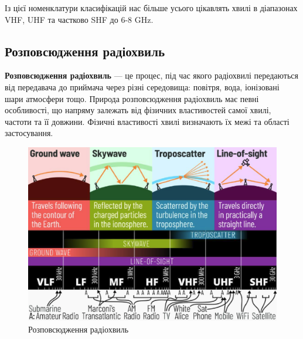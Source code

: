 \documentclass{article}
\begin{document}
Із цієї номенклатури класифікацій нас більше усього цікавлять хвилі в діапазонах VHF, UHF та частково SHF до 6-8 GHz.


\subsection{Розповсюдження радіохвиль}

\textbf{Розповсюдження радіохвиль} — це процес, під час якого радіохвилі передаються від передавача до приймача через різні середовища: повітря, вода, іонізовані шари атмосфери тощо. Природа розповсюдження радіохвиль має певні особливості, що напряму залежать від фізичних властивостей самої хвилі, частоти та її довжини. Фізичні властивості хвилі визначають їх межі та області застосування.

\begin{figure}[h!]
	\centering
	\includegraphics[width=0.8\linewidth]{images/radio-propagation.png}
	\caption{\label{fig:radio-propagation} Розповсюдження радіохвиль}
\end{figure}
\end{document}
